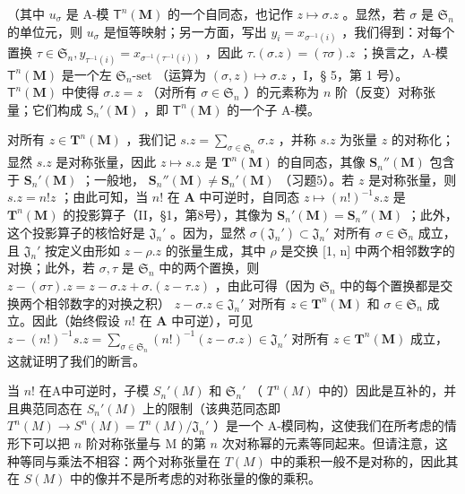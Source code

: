 （其中 \(u_{\sigma}\) 是 A-模 \(\mathsf{T}^n(\mathbf{M})\) 的一个自同态，也记作 \(z \mapsto \sigma. z\) 。显然，若 \(\sigma\) 是 \(\mathfrak{S}_n\) 的单位元，则 \(u_{\sigma}\) 是恒等映射；另一方面，写出 \(y_i = x_{\sigma^{-1}(i)}\) ，我们得到：对每个置换 \(\tau \in \mathfrak{S}_n, y_{\tau^{-1}(i)} = x_{\sigma^{-1}(\tau^{-1}(i))}\) ，因此 \(\tau. (\sigma. z) = (\tau \sigma). z\) ；换言之，A-模 \(\mathsf{T}^n(\mathbf{M})\) 是一个左 \(\mathfrak{S}_n\text{-set}\) （运算为 \((\sigma, z) \mapsto \sigma. z\) ，I，§ 5，第 1 号）。 \(\mathsf{T}^n(\mathbf{M})\) 中使得 \(\sigma. z = z\) （对所有 \(\sigma \in \mathfrak{S}_n\) ）的元素称为 \(n\) 阶（反变）对称张量；它们构成 \(\mathsf{S}_n'(\mathbf{M})\) ，即 \(\mathsf{T}^n(\mathbf{M})\) 的一个子 A-模。

对所有 \(z \in \mathbf{T}^n(\mathbf{M})\) ，我们记 \(s.z = \sum_{\sigma \in \mathfrak{S}_n} \sigma.z\) ，并称 \(s.z\) 为张量 \(z\) 的对称化；显然 \(s.z\) 是对称张量，因此 \(z \mapsto s.z\) 是 \(\mathbf{T}^n(\mathbf{M})\) 的自同态，其像 \(\mathbf{S}_n''(\mathbf{M})\) 包含于 \(\mathbf{S}_n'(\mathbf{M})\) ；一般地， \(\mathbf{S}_n''(\mathbf{M}) \neq \mathbf{S}_n'( \mathbf{M})\) （习题5）。若 \(z\) 是对称张量，则 \(s.z = n!z\) ；由此可知，当 \(n!\) 在 \(\mathbf{A}\) 中可逆时，自同态 \(z \mapsto (n!)^{-1}s.z\) 是 \(\mathbf{T}^n(\mathbf{M})\) 的投影算子（II，§1，第8号），其像为 \(\mathbf{S}_n'(\mathbf{M}) = \mathbf{S}_n''(\mathbf{M})\) ；此外，这个投影算子的核恰好是 \(\mathfrak{J}_n'\) 。因为，显然 \(\sigma(\mathfrak{J}_n') \subset \mathfrak{J}_n'\) 对所有 \(\sigma \in \mathfrak{S}_n\) 成立，且 \(\mathfrak{J}_n'\) 按定义由形如 \(z - \rho.z\) 的张量生成，其中 \(\rho\) 是交换 {[}1, n{]} 中两个相邻数字的对换；此外，若 \(\sigma, \tau\) 是 \(\mathfrak{S}_n\) 中的两个置换，则 \(z - (\sigma\tau).z = z - \sigma.z + \sigma.(z - \tau.z)\) ，由此可得（因为 \(\mathfrak{S}_n\) 中的每个置换都是交换两个相邻数字的对换之积） \(z - \sigma.z \in \mathfrak{J}_n'\) 对所有 \(z \in \mathbf{T}^n(\mathbf{M})\) 和 \(\sigma \in \mathfrak{S}_n\) 成立。因此（始终假设 \(n!\) 在 \(\mathbf{A}\) 中可逆），可见 \(z - (n!)^{-1}s.z = \sum_{\sigma \in \mathfrak{S}_n}(n!)^{-1}(z - \sigma.z) \in \mathfrak{J}_n'\) 对所有 \(z \in \mathbf{T}^n(\mathbf{M})\) 成立，这就证明了我们的断言。

当 \(n!\) 在A中可逆时，子模 \(S_n'(M)\) 和 \(\mathfrak{S}_n'\) （ \(T^n(M)\) 中的）因此是互补的，并且典范同态在 \(S_n'(M)\) 上的限制（该典范同态即 \(T^n(M) \to S^n(M) = T^n(M)/\mathfrak{J}_n'\) ）是一个 A-模同构，这使我们在所考虑的情形下可以把 \(n\) 阶对称张量与 M 的第 \(n\) 次对称幂的元素等同起来。但请注意，这种等同与乘法不相容：两个对称张量在 \(T(M)\) 中的乘积一般不是对称的，因此其在 \(S(M)\) 中的像并不是所考虑的对称张量的像的乘积。

